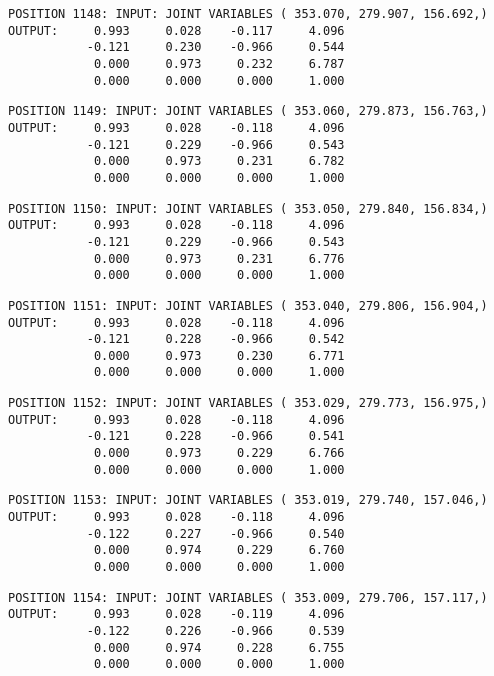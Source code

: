 \begin{verbatim}
POSITION 1148: INPUT: JOINT VARIABLES ( 353.070, 279.907, 156.692,)
OUTPUT:     0.993     0.028    -0.117     4.096
           -0.121     0.230    -0.966     0.544
            0.000     0.973     0.232     6.787
            0.000     0.000     0.000     1.000
\end{verbatim} \pagebreak[1]\begin{verbatim}
POSITION 1149: INPUT: JOINT VARIABLES ( 353.060, 279.873, 156.763,)
OUTPUT:     0.993     0.028    -0.118     4.096
           -0.121     0.229    -0.966     0.543
            0.000     0.973     0.231     6.782
            0.000     0.000     0.000     1.000
\end{verbatim} \pagebreak[1]\begin{verbatim}
POSITION 1150: INPUT: JOINT VARIABLES ( 353.050, 279.840, 156.834,)
OUTPUT:     0.993     0.028    -0.118     4.096
           -0.121     0.229    -0.966     0.543
            0.000     0.973     0.231     6.776
            0.000     0.000     0.000     1.000
\end{verbatim} \pagebreak[1]\begin{verbatim}
POSITION 1151: INPUT: JOINT VARIABLES ( 353.040, 279.806, 156.904,)
OUTPUT:     0.993     0.028    -0.118     4.096
           -0.121     0.228    -0.966     0.542
            0.000     0.973     0.230     6.771
            0.000     0.000     0.000     1.000
\end{verbatim} \pagebreak[1]\begin{verbatim}
POSITION 1152: INPUT: JOINT VARIABLES ( 353.029, 279.773, 156.975,)
OUTPUT:     0.993     0.028    -0.118     4.096
           -0.121     0.228    -0.966     0.541
            0.000     0.973     0.229     6.766
            0.000     0.000     0.000     1.000
\end{verbatim} \pagebreak[1]\begin{verbatim}
POSITION 1153: INPUT: JOINT VARIABLES ( 353.019, 279.740, 157.046,)
OUTPUT:     0.993     0.028    -0.118     4.096
           -0.122     0.227    -0.966     0.540
            0.000     0.974     0.229     6.760
            0.000     0.000     0.000     1.000
\end{verbatim} \pagebreak[1]\begin{verbatim}
POSITION 1154: INPUT: JOINT VARIABLES ( 353.009, 279.706, 157.117,)
OUTPUT:     0.993     0.028    -0.119     4.096
           -0.122     0.226    -0.966     0.539
            0.000     0.974     0.228     6.755
            0.000     0.000     0.000     1.000
\end{verbatim} \pagebreak[1]\begin{verbatim}

\end{verbatim}
